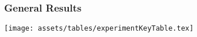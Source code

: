 \begin{frame}
    \frametitle{General Results}
    \centering
        \texttt{[image: assets/tables/experimentKeyTable.tex]}
\end{frame}

